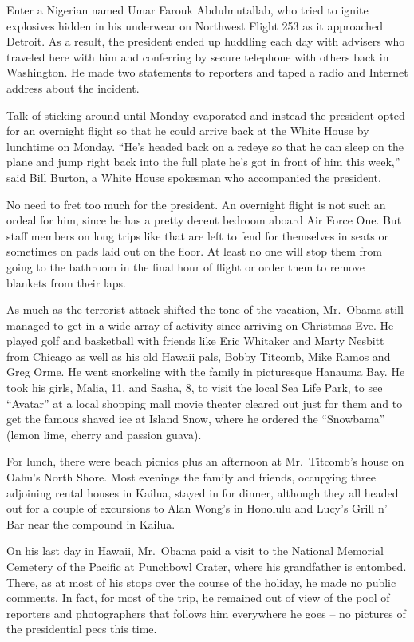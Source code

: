 ﻿\documentclass[12pt]{article}
\begin{document}
Enter a Nigerian named Umar Farouk Abdulmutallab, who tried to ignite explosives hidden in his
underwear on Northwest Flight 253 as it approached Detroit. As a result, the president ended up
huddling each day with advisers who traveled here with him and conferring by secure telephone with
others back in Washington. He made two statements to reporters and taped a radio and Internet
address about the incident.

Talk of sticking around until Monday evaporated and instead the president opted for an overnight
flight so that he could arrive back at the White House by lunchtime on Monday. ``He's headed back on
a redeye so that he can sleep on the plane and jump right back into the full plate he's got in front
of him this week,'' said Bill Burton, a White House spokesman who accompanied the president.

No need to fret too much for the president. An overnight flight is not such an ordeal for him, since
he has a pretty decent bedroom aboard Air Force One. But staff members on long trips like that are
left to fend for themselves in seats or sometimes on pads laid out on the floor. At least no one
will stop them from going to the bathroom in the final hour of flight or order them to remove
blankets from their laps.

As much as the terrorist attack shifted the tone of the vacation, Mr.~Obama still managed to get in
a wide array of activity since arriving on Christmas Eve. He played golf and basketball with friends
like Eric Whitaker and Marty Nesbitt from Chicago as well as his old Hawaii pals, Bobby Titcomb,
Mike Ramos and Greg Orme. He went snorkeling with the family in picturesque Hanauma Bay. He took his
girls, Malia, 11, and Sasha, 8, to visit the local Sea Life Park, to see ``Avatar'' at a local
shopping mall movie theater cleared out just for them and to get the famous shaved ice at Island
Snow, where he ordered the ``Snowbama'' (lemon lime, cherry and passion guava).

For lunch, there were beach picnics plus an afternoon at Mr.~Titcomb's house on Oahu's North Shore.
Most evenings the family and friends, occupying three adjoining rental houses in Kailua, stayed in
for dinner, although they all headed out for a couple of excursions to Alan Wong's in Honolulu and
Lucy's Grill n' Bar near the compound in Kailua.

On his last day in Hawaii, Mr.~Obama paid a visit to the National Memorial Cemetery of the Pacific
at Punchbowl Crater, where his grandfather is entombed. There, as at most of his stops over the
course of the holiday, he made no public comments. In fact, for most of the trip, he remained out of
view of the pool of reporters and photographers that follows him everywhere he goes -- no pictures
of the presidential pecs this time.
\end{document}
